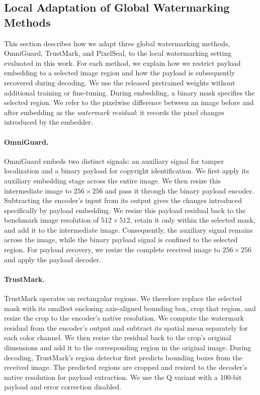 \subsection{Local Adaptation of Global Watermarking Methods}
\label{app:local-adaptations}

This section describes how we adapt three global watermarking methods, OmniGuard, TrustMark, and PixelSeal, to the local watermarking setting evaluated in this work.
For each method, we explain how we restrict payload embedding to a selected image region and how the payload is subsequently recovered during decoding.
We use the released pretrained weights without additional training or fine-tuning.
During embedding, a binary mask specifies the selected region.
We refer to the pixelwise difference between an image before and after embedding as the \emph{watermark residual}: it records the pixel changes introduced by the embedder.

\paragraph{OmniGuard.}
OmniGuard embeds two distinct signals: an auxiliary signal for tamper localization and a binary payload for copyright identification.
We first apply its auxiliary embedding stage across the entire image.
We then resize this intermediate image to \(256\times256\) and pass it through the binary payload encoder.
Subtracting the encoder's input from its output gives the changes introduced specifically by payload embedding.
We resize this payload residual back to the benchmark image resolution of \(512\times512\), retain it only within the selected mask, and add it to the intermediate image.
Consequently, the auxiliary signal remains across the image, while the binary payload signal is confined to the selected region.
For payload recovery, we resize the complete received image to \(256\times256\) and apply the payload decoder.

\paragraph{TrustMark.}
TrustMark operates on rectangular regions.
We therefore replace the selected mask with its smallest enclosing axis-aligned bounding box, crop that region, and resize the crop to the encoder's native resolution.
We compute the watermark residual from the encoder's output and subtract its spatial mean separately for each color channel.
We then resize the residual back to the crop's original dimensions and add it to the corresponding region in the original image.
During decoding, TrustMark's region detector first predicts bounding boxes from the received image.
The predicted regions are cropped and resized to the decoder's native resolution for payload extraction.
We use the Q variant with a 100-bit payload and error correction disabled.

